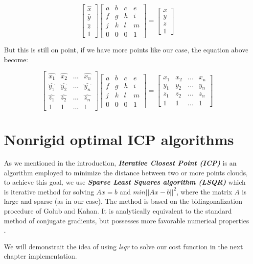\documentclass[../structure.tex]{subfiles}
\begin{document}
\begin{equation*}
\begin{bmatrix}
\hat{x} \\ \hat{y} \\ \hat{z} \\ 1
\end{bmatrix}
\begin{bmatrix}
a & b & c & e\\
f & g & h & i\\
j & k & l & m\\
0 & 0 & 0 & 1
\end{bmatrix}
=
\begin{bmatrix}
x \\ y \\ z \\ 1
\end{bmatrix}
\end{equation*}

But this is still on point, if we have more points like our case, the equation above become:

\begin{equation*}
\begin{bmatrix}
\hat{x_{1}} & \hat{x_{2}} & \dots & \hat{x_{n}}\\
\hat{y_{1}} & \hat{y_{2}} & \dots & \hat{y_{n}}\\
\hat{z_{1}} & \hat{z_{2}} & \dots & \hat{z_{n}}\\
1 & 1 & \dots & 1
\end{bmatrix}
\begin{bmatrix}
a & b & c & e\\
f & g & h & i\\
j & k & l & m\\
0 & 0 & 0 & 1
\end{bmatrix}
=
\begin{bmatrix}
x_{1} & x_{2} & \dots & x_{n}\\
y_{1} & y_{2} & \dots & y_{n}\\
z_{1} & z_{2} & \dots & z_{n}\\
1 & 1 & \dots & 1
\end{bmatrix}
\end{equation*}

\section{Nonrigid optimal ICP algorithms}
As we mentioned in the introduction, \textit{\textbf{ Iterative Closest Point (ICP)}} is an algorithm employed to minimize the distance between two or more points clouds, to achieve this goal, we use \textit{\textbf{Sparse Least Squares algorithm (LSQR)}} which is iterative method for solving $Ax=b$ and $min||Ax-b||^2$, where the matrix $A$ is large and sparse (as in our case). The method is based on the bidiagonalization procedure of Golub and Kahan. It is analytically equivalent to the standard method of conjugate gradients, but possesses more favorable numerical properties \cite{Paige1982a}.

We will demonstrait the idea of using \textit{lsqr} to solve our cost function in the next chapter implementation.
\end{document}

